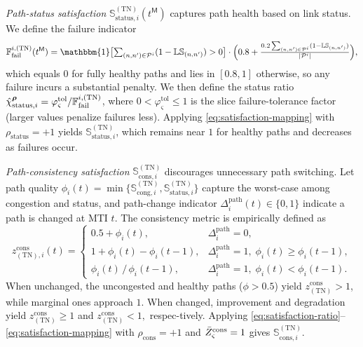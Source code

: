\documentclass[12pt,lettersize,journal,onecolumn]{IEEEtran}
\begin{document}
\textit{Path-status satisfaction} $\mathbb{S}^{\mathrm{(TN)}}_{\mathrm{status},i}(t^\mathsf{M})$ captures path health based on link status. We define the failure indicator
$$
\mathbb{F}^{i,\mathrm{(TN)}}_{\mathrm{fail}}(t^\mathsf{M}) = \mathbbm{1}\bigl[\textstyle\sum\nolimits_{(n,n')\in\mathcal{P}^{i}}(1-\mathbb{LS}_{(n,n')})>0\bigr] \cdot \Bigl(0.8 + \frac{0.2\sum_{(n,n')\in\mathcal{P}^{i}}(1-\mathbb{LS}_{(n,n')})}{|\mathcal{P}^{i}|}\Bigr), 
$$
which equals $0$ for fully healthy paths and lies in $[0.8,1]$ otherwise, so any failure incurs a substantial penalty. We then define the status ratio $\Hat{\chi}^{\boldsymbol{\rho}}_{\mathrm{status},i}=\varphi_{\varsigma}^{\mathrm{tol}}/\mathbb{F}^{i,\mathrm{(TN)}}_{\mathrm{fail}}$, where $0<\varphi_{\varsigma}^{\mathrm{tol}}\le1$ is the slice failure-tolerance factor (larger values penalize failures less). Applying \eqref{eq:satisfaction-mapping} with $\rho_{\mathrm{status}}=+1$ yields $\mathbb{S}^{\mathrm{(TN)}}_{\mathrm{status},i}$, which remains near $1$ for healthy paths and decreases as failures occur.

\textit{Path-consistency satisfaction} $\mathbb{S}^{\mathrm{(TN)}}_{\mathrm{cons},i}$ discourages unnecessary path switching. Let path quality $\phi_{i}(t)=\min\{\mathbb{S}^{\mathrm{(TN)}}_{\mathrm{cong},i},\mathbb{S}^{\mathrm{(TN)}}_{\mathrm{status},i}\}$ capture the worst-case among congestion and status, and path-change indicator $\Delta^{\mathrm{path}}_{i}(t)\in\{0,1\}$ indicate a path is changed at MTI $t$. The consistency metric is empirically defined as 
$$
z^{\mathrm{cons}}_{\mathrm{(TN)},i}(t) =
\begin{cases}
0.5 + \phi_{i}(t), & \Delta^{\mathrm{path}}_{i}=0,\\[0.2ex]
1 + \phi_{i}(t) - \phi_{i}(t-1), & \Delta^{\mathrm{path}}_{i}=1,\;\phi_{i}(t)\ge\phi_{i}(t-1),\\[0.2ex]
\phi_{i}(t)\,/\,\phi_{i}(t-1), & \Delta^{\mathrm{path}}_{i}=1,\;\phi_{i}(t)<\phi_{i}(t-1).
\end{cases}
$$
When unchanged, the uncongested and healthy paths ($\phi>0.5$) yield $z^{\mathrm{cons}}_{\mathrm{(TN)}}>1$, while marginal ones approach $1$. When changed, improvement and degradation yield $z^{\mathrm{cons}}_{\mathrm{(TN)}}\ge1$ and $z^{\mathrm{cons}}_{\mathrm{(TN)}}<1,$ respec-tively. Applying \eqref{eq:satisfaction-ratio}--\eqref{eq:satisfaction-mapping} with $\rho_{\mathrm{cons}}=+1$ and $\Bar{Z}^{\mathrm{cons}}_{\varsigma}=1$ gives $\mathbb{S}^{\mathrm{(TN)}}_{\mathrm{cons},i}$.
\end{document}
